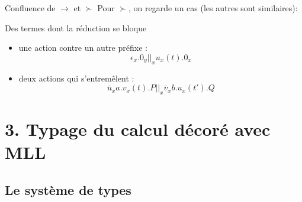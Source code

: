 \documentclass[11pt]{beamer}
\newcommand{\dlsucc}{\rotatebox[origin=c]{45}{$\prec$}}
\newcommand{\drsucc}{\rotatebox[origin=c]{-45}{$\succ$}}
\begin{document}
\begin{frame}{Confluence de $\to$ et $\succ$}
Pour $\succ$, on regarde un cas (les autres sont similaires):
\end{frame}

\begin{frame}{Des termes dont la réduction se bloque}
\begin{itemize}
\item une action contre un autre préfixe :
\[\epsilon_x.0_y||_xu_x(t).0_x\]
\item deux actions qui s'entremêlent :
\[\bar{u}_xa.v_x(t).P||_x\bar{v}_xb.u_x(t').Q\]
\end{itemize}
\end{frame}

\section{3. Typage du calcul décoré avec MLL}
\subsection{Le système de types}
\end{document}
